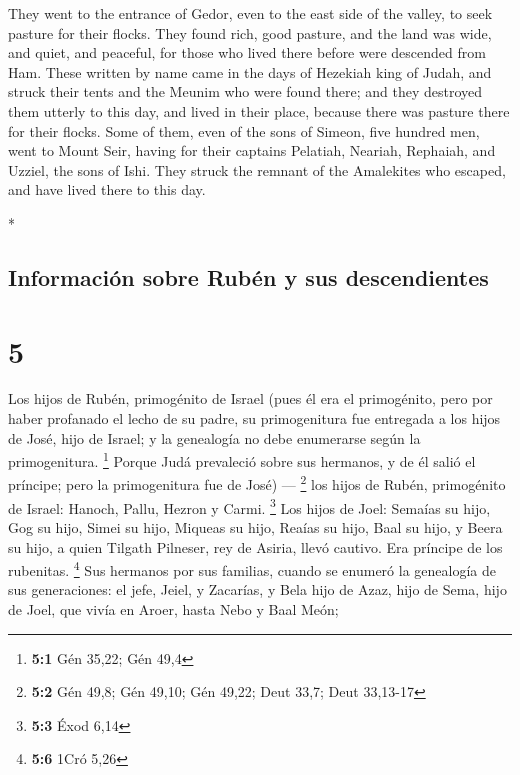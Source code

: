 \begin{paracol}{2}
\begin{otherlanguage}{english}
 They went to the entrance of Gedor, even to the east
side of the valley, to seek pasture for their flocks. 
They found rich, good pasture, and the land was wide, and quiet, and
peaceful, for those who lived there before were descended from Ham.
 These written by name came in the days of Hezekiah king
of Judah, and struck their tents and the Meunim who were found there;
and they destroyed them utterly to this day, and lived in their place,
because there was pasture there for their flocks.  Some
of them, even of the sons of Simeon, five hundred men, went to Mount
Seir, having for their captains Pelatiah, Neariah, Rephaiah, and Uzziel,
the sons of Ishi.  They struck the remnant of the
Amalekites who escaped, and have lived there to this day.

\end{otherlanguage}

\switchcolumn[0]*

\hypertarget{informaciuxf3n-sobre-rubuxe9n-y-sus-descendientes}{%
\subsection{Información sobre Rubén y sus
descendientes}\label{informaciuxf3n-sobre-rubuxe9n-y-sus-descendientes}}

\hypertarget{section-8}{%
\section{5}\label{section-8}}

 Los hijos de Rubén, primogénito de Israel (pues él era el
primogénito, pero por haber profanado el lecho de su padre, su
primogenitura fue entregada a los hijos de José, hijo de Israel; y la
genealogía no debe enumerarse según la primogenitura. \footnote{\textbf{5:1}
  Gén 35,22; Gén 49,4}  Porque Judá prevaleció sobre sus
hermanos, y de él salió el príncipe; pero la primogenitura fue de José)
--- \footnote{\textbf{5:2} Gén 49,8; Gén 49,10; Gén 49,22; Deut 33,7;
  Deut 33,13-17}  los hijos de Rubén, primogénito de
Israel: Hanoch, Pallu, Hezron y Carmi. \footnote{\textbf{5:3} Éxod 6,14}
 Los hijos de Joel: Semaías su hijo, Gog su hijo, Simei su
hijo,  Miqueas su hijo, Reaías su hijo, Baal su hijo,
 y Beera su hijo, a quien Tilgath Pilneser, rey de Asiria,
llevó cautivo. Era príncipe de los rubenitas. \footnote{\textbf{5:6}
  1Cró 5,26}  Sus hermanos por sus familias, cuando se
enumeró la genealogía de sus generaciones: el jefe, Jeiel, y Zacarías,
 y Bela hijo de Azaz, hijo de Sema, hijo de Joel, que
vivía en Aroer, hasta Nebo y Baal Meón;


\end{paracol}
